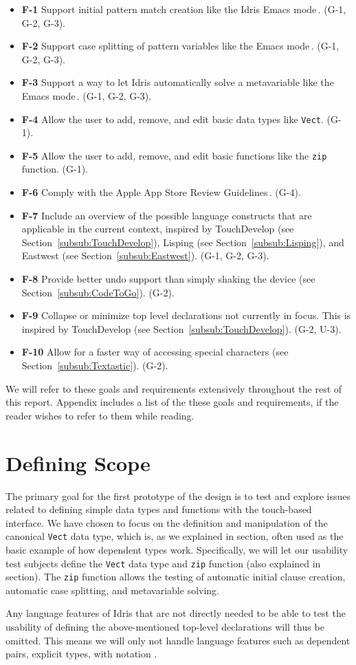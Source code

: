 \begin{itemize}
	\item \textbf{F-1} Support initial pattern match creation like the Idris Emacs mode\,\cite{Idris:EmacsMode}. (G-1, G-2, G-3).
	\item \textbf{F-2} Support case splitting of pattern variables like the Emacs mode\,\cite{Idris:EmacsMode}. (G-1, G-2, G-3).
	\item \textbf{F-3} Support a way to let Idris automatically solve a metavariable like the Emacs mode\,\cite{Idris:EmacsMode}. (G-1, G-2, G-3).
	\item \textbf{F-4} Allow the user to add, remove, and edit basic data types like \texttt{Vect}. (G-1).
	\item \textbf{F-5} Allow the user to add, remove, and edit basic functions like the \texttt{zip} function. (G-1).
	\item \textbf{F-6} Comply with the Apple App Store Review Guidelines\,\cite{AppStoreGuidelines}. (G-4).
	\item \textbf{F-7} Include an overview of the possible language constructs that are	applicable in the current context, inspired by TouchDevelop (see Section~\ref{subsub:TouchDevelop}), Lisping (see Section~\ref{subsub:Lisping}), and Eastwest (see Section~\ref{subsub:Eastwest}). (G-1, G-2, G-3).
	\item \textbf{F-8} Provide better undo support than simply shaking the device (see Section~\ref{subsub:CodeToGo}). (G-2).
	\item \textbf{F-9} Collapse or minimize top level declarations not currently in focus. This is inspired by TouchDevelop	(see Section~\ref{subsub:TouchDevelop}). (G-2, U-3).
	\item \textbf{F-10} Allow for a faster way of accessing special characters (see Section~\ref{subsub:Textastic}). (G-2).
\end{itemize}

We will refer to these goals and requirements extensively throughout the rest of this report. Appendix includes a list of the these goals and requirements, if the reader wishes to refer to them while reading.

\section{Defining Scope} 
The primary goal for the first prototype of the design is to test and explore
issues related to defining simple data types and functions with the touch-based interface. 
We have chosen to focus on the definition and manipulation of the canonical \texttt{Vect} data type, which is, as we explained in section, often used as the basic example of how dependent types work.
Specifically, we will let our usability test subjects define the \texttt{Vect} data type and \texttt{zip} function (also explained in section).
The \texttt{zip} function allows the testing of automatic initial clause creation, automatic case splitting, and metavariable solving.

Any language features of Idris that are not directly needed to be able to test the usability of defining the above-mentioned top-level declarations will thus be omitted. This means we will only not handle language features such as dependent pairs, explicit types, with notation .
